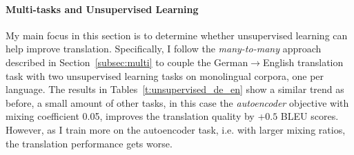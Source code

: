 \paragraph{Multi-tasks and Unsupervised Learning}
My main focus in this section is to determine whether unsupervised
learning can help improve translation. Specifically, I follow the {\it
many-to-many} approach described in Section~\ref{subsec:multi} to couple
the German$\rightarrow$English translation task with two unsupervised learning
tasks on monolingual corpora, one per language.
The results in Tables~\ref{t:unsupervised_de_en} show a similar trend as before,
a small amount of other tasks, in this case the {\it autoencoder} objective with
mixing coefficient 0.05, improves the translation quality by +$0.5$ BLEU
scores. However, as I train more on the 
autoencoder task, i.e. with larger mixing ratios, the translation performance gets worse. 


